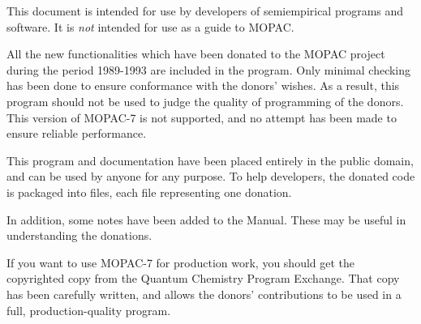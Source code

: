 
                   


 This document is intended for use by developers of semiempirical
programs and software.  It is {\em not} intended for use as a guide
to MOPAC.

All the new functionalities which have been donated to the MOPAC project
during the period 1989-1993 are included in the program.  Only minimal
checking has been done to ensure conformance with the donors' wishes.
As a result, this program should not be used to judge the quality
of programming of the donors.  This version of MOPAC-7 is not supported, 
and no attempt has been made to ensure reliable performance.

This program and documentation have been placed entirely in the public
domain, and can be used by anyone for any purpose.  
To help developers, the donated code is packaged into files, each
file representing one donation.

In addition, some notes have been added to the Manual.  These may be useful
in understanding the donations.


If you want to use MOPAC-7 for production work, you should get the
copyrighted copy from the Quantum Chemistry Program Exchange.  
That copy has been carefully written, and allows the donors' contributions
to be used in a full, production-quality program.

\lhead[\fancyplain{}{ }]{\fancyplain{}{\bf\rightmark}}
\rhead[\fancyplain{}{\bf\leftmark}]{\fancyplain{}{ }}


